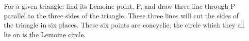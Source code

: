 For a given triangle: find its Lemoine point, P, and draw three line through
P parallel to the three sides of the triangle. These three lines will cut the
sides of the triangle in six places. These six points are concyclic; the circle 
which they all lie on is the Lemoine circle.